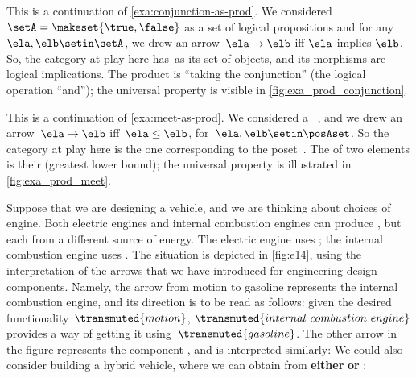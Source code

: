 \begin{example}
    \label{exa:conjunction-as-prod-cont}
    This is a continuation of \cref{exa:conjunction-as-prod}.
    We considered~$\setA = \makeset{ \true, \false }$ as a set of logical propositions and for any~$\ela, \elb \setin \setA$, we drew an arrow~$\ela \to \elb$ iff $\ela$ implies $\elb$.
    So, the category at play here has~\setA as its set of objects, and its morphisms are logical implications.
    The product is ``taking the conjunction'' (the logical operation ``and''); the universal property is visible in \cref{fig:exa_prod_conjunction}.

\end{example}

\begin{marginfigure}
    \centering
    \caption{Taking the meet}
    \label{fig:exa_prod_meet_cont}
\end{marginfigure}

\begin{example}
    \label{exa:meet-as-prod-cont}
    This is a continuation of \cref{exa:meet-as-prod}.
    We considered a ~\posA, and we drew an arrow~$\ela \to \elb$ iff~$\ela \leq \elb$, for~$\ela,\elb\setin \posAset$.
    So the category at play here is the one corresponding to the poset~\posA.
    The  of two elements is their  (greatest lower bound); the universal property is illustrated in \cref{fig:exa_prod_meet}.
\end{example}

\begin{example}
    Suppose that we are designing a vehicle, and we are thinking about choices of engine.
    Both electric engines and internal combustion engines can produce , but each from a different source of energy.
    The electric engine uses ; the internal combustion engine uses .
    The situation is depicted in \cref{fig:e14}, using the interpretation of the arrows that we have introduced for engineering design components.
    Namely, the arrow from motion to gasoline represents the internal combustion engine, and its direction is to be read as follows: given the desired functionality~$\transmuted{motion}$, $\transmuted{internal \ combustion \ engine}$ provides a way of getting it using~$\transmuted{gasoline}$.
    The other arrow in the figure represents the component , and is interpreted similarly:
    We could also consider building a hybrid vehicle, where we can obtain  from \textbf{either}  \textbf{or} :
\end{example}

